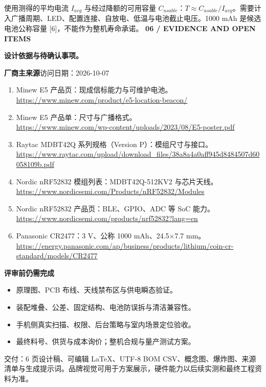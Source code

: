 \documentclass[UTF8,fontset=fandol,11pt]{ctexart}
\newcommand{\kicker}[1]{{\color{green}\small\bfseries #1}\par}
\newcommand{\titleline}[1]{{\LARGE\bfseries #1}\par\vspace{4mm}}
\newcommand{\note}[1]{\par\colorbox{green!8}{\parbox{\dimexpr\linewidth-2\fboxsep}{\small #1}}\par}
\begin{document}
使用测得的平均电流 $I_{avg}$ 与经过降额的可用容量 $C_{usable}$：$T\approx C_{usable}/I_{avg}$。需要计入广播周期、LED、配置连接、自放电、低温与电池截止电压。1000 mAh 是候选电池公称容量 [6]，不能作为整机寿命承诺。
\newpage
\kicker{06 / EVIDENCE AND OPEN ITEMS}\titleline{设计依据与待确认事项。}
\textbf{厂商主来源}\hfill{\small 访问日期：2026-10-07}
\small
\begin{enumerate}[leftmargin=1.5em,itemsep=8pt]
\item Minew E5 产品页：现成信标能力与可维护电池。\\\url{https://www.minew.com/product/e5-location-beacon/}
\item Minew E5 产品单：尺寸与广播格式。\\\url{https://www.minew.com/wp-content/uploads/2023/08/E5-poster.pdf}
\item Raytac MDBT42Q 系列规格（Version P）：模组尺寸与接口。\\\url{https://www.raytac.com/upload/download_files/38a8a4a0aff945d8484507d60058109b.pdf}
\item Nordic nRF52832 模组列表：MDBT42Q-512KV2 与芯片天线。\\\url{https://www.nordicsemi.com/Products/nRF52832/Modules}
\item Nordic nRF52832 产品页：BLE、GPIO、ADC 等 SoC 能力。\\\url{https://www.nordicsemi.com/products/nrf52832?lang=en}
\item Panasonic CR2477：3 V、公称 1000 mAh、24.5$\times$7.7 mm。\\\url{https://energy.panasonic.com/ap/business/products/lithium/coin-cr-standard/models/CR2477}
\end{enumerate}\normalsize
\vspace{2mm}
\textbf{评审前仍需完成}
\begin{itemize}
\item 原理图、PCB 布线、天线禁布区与供电瞬态验证。
\item 装配堆叠、公差、固定结构、电池防误拆与清洁兼容性。
\item 手机侧真实扫描、权限、后台策略与室内场景定位验收。
\item 最终料号、供货与成本询价；整机合规与量产测试方案。
\end{itemize}
\note{交付：6 页设计稿、可编辑 LaTeX、UTF-8 BOM CSV、概念图、爆炸图、来源清单与生成提示词。品牌视觉可用于方案展示，硬件能力以后续实测和最终工程资料为准。}
\end{document}
